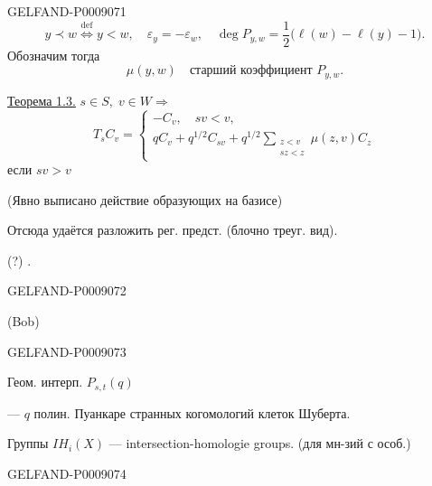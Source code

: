 \begin{GelfandAdjacentEvidence}{GELFAND-P000907}{1}
\begin{equation*}
y\prec w\overset{\mathrm{def}}{\Longleftrightarrow}y<w,\quad
\varepsilon_y=-\varepsilon_w,\quad
\deg P_{y,w}=\frac12\bigl(\ell(w)-\ell(y)-1\bigr).
\tag{17}
\end{equation*}
Обозначим тогда
\[
\mu(y,w)\quad\text{старший коэффициент }P_{y,w}.
\]

\uline{Теорема 1.3.} \(s\in S,\;v\in W\Rightarrow\)
\begin{equation*}
T_sC_v=\begin{cases}
-C_v,\quad sv<v,\\
qC_v+q^{1/2}C_{sv}+q^{1/2}\displaystyle\sum_{\substack{z<v\\sz<z}}\mu(z,v)C_z
\end{cases}
\tag{18}
\end{equation*}
если $sv>v$

(Явно выписано действие образующих на базисе)

Отсюда удаётся разложить рег. предст. (блочно треуг. вид).

 (?) \quad {}.
\end{GelfandAdjacentEvidence}
\begin{GelfandAdjacentEvidence}{GELFAND-P000907}{2}


(Bob)
\end{GelfandAdjacentEvidence}
\begin{GelfandAdjacentEvidence}{GELFAND-P000907}{3}


Геом. интерп. $P_{s,t}(q)$

--- $q$ полин. Пуанкаре странных когомологий клеток Шуберта.

Группы $IH_i(X)$ --- intersection-homologie groups. (для мн-зий с особ.)
\end{GelfandAdjacentEvidence}
\begin{GelfandAdjacentEvidence}{GELFAND-P000907}{4}

\end{GelfandAdjacentEvidence}

